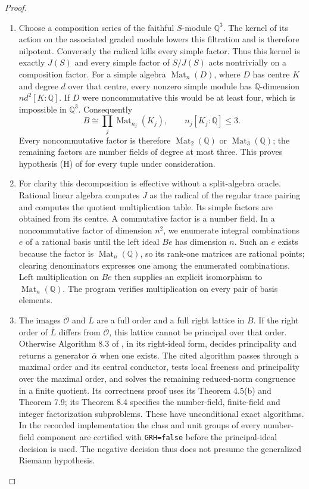 \documentclass[11pt,a4paper]{article}
\theoremstyle{definition}
\begin{document}
\begin{proof}
\begin{enumerate}[label=\arabic*.]
\item Choose a composition series of the faithful $S$-module $\mathbb Q^3$.
The kernel of its action on the associated graded module lowers this
filtration and is therefore nilpotent. Conversely the radical kills
every simple factor. Thus this kernel is exactly $J(S)$ and every
simple factor of $S/J(S)$ acts nontrivially on a composition factor.
For a simple algebra $\operatorname{Mat}_n(D)$, where $D$ has centre
$K$ and degree $d$ over that centre, every nonzero simple module has
$\mathbb Q$-dimension $n d^2[K:\mathbb Q]$. If $D$ were
noncommutative this would be at least four, which is impossible in
$\mathbb Q^3$. Consequently
\[
 B\cong\prod_j\operatorname{Mat}_{n_j}(K_j),\qquad
 n_j[K_j:\mathbb Q]\le3.                                    \tag{F.IC3}\label{maps:eq:F.IC3}
\]
Every noncommutative factor is therefore
$\operatorname{Mat}_2(\mathbb Q)$ or
$\operatorname{Mat}_3(\mathbb Q)$; the remaining factors are number
fields of degree at most three. This proves hypothesis (H) of
\cite[Algorithm 8.3, p.~21]{rootBHJ22} for every tuple under consideration.

\item For clarity this decomposition is effective without a split-algebra
oracle. Rational linear algebra computes $J$ as the radical of the
regular trace pairing and computes the quotient multiplication table.
Its simple factors are obtained from its centre. A commutative factor
is a number field. In a noncommutative factor of dimension $n^2$, we
enumerate integral combinations $e$ of a rational basis until the
left ideal $Be$ has dimension $n$. Such an $e$ exists because the
factor is $\operatorname{Mat}_n(\mathbb Q)$, so its rank-one matrices
are rational points; clearing denominators expresses one among the
enumerated combinations. Left multiplication on $Be$ then supplies
an explicit isomorphism to $\operatorname{Mat}_n(\mathbb Q)$.
The program verifies multiplication on every pair of basis elements.

\item The images $\overline{\mathcal O}$ and $\overline L$ are a full order
and a full right lattice in $B$. If the right order of
$\overline L$ differs from $\overline{\mathcal O}$, this lattice
cannot be principal over that order. Otherwise Algorithm 8.3 of
\cite[Algorithm 8.3 and its correctness proof, p.~21]{rootBHJ22}, in its right-ideal form, decides principality and
returns a generator $\overline\alpha$ when one exists. The cited
algorithm passes through a maximal order and its central conductor,
tests local freeness and principality over the maximal order, and
solves the remaining reduced-norm congruence in a finite quotient.
Its correctness proof uses its Theorem 4.5(b) and Theorem 7.9; its
Theorem 8.4 specifies the number-field, finite-field and integer
factorization subproblems. These have unconditional exact algorithms.
In the recorded implementation the class and unit groups of every
number-field component are certified with \texttt{GRH=false} before
the principal-ideal decision is used. The negative decision thus
does not presume the generalized Riemann hypothesis.


\end{enumerate}
\end{proof}
\end{document}
